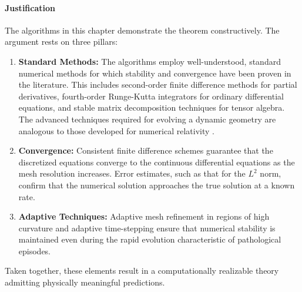 \paragraph{Justification}
The algorithms in this chapter demonstrate the theorem constructively. The argument rests on three pillars:
\begin{enumerate}
    \item \textbf{Standard Methods:} The algorithms employ well-understood, standard numerical methods for which stability and convergence have been proven in the literature. This includes second-order finite difference methods for partial derivatives, fourth-order Runge-Kutta integrators for ordinary differential equations, and stable matrix decomposition techniques for tensor algebra. The advanced techniques required for evolving a dynamic geometry are analogous to those developed for numerical relativity \autocite{BaumgarteShapiro2010}.
    \item \textbf{Convergence:} Consistent finite difference schemes guarantee that the discretized equations converge to the continuous differential equations as the mesh resolution increases. Error estimates, such as that for the \(L^2\) norm, confirm that the numerical solution approaches the true solution at a known rate.
    \item \textbf{Adaptive Techniques:} Adaptive mesh refinement in regions of high curvature and adaptive time-stepping ensure that numerical stability is maintained even during the rapid evolution characteristic of pathological episodes.
\end{enumerate}
Taken together, these elements result in a computationally realizable theory admitting physically meaningful predictions. 